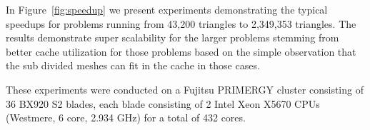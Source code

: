 \documentclass{manual}
\begin{document}
In Figure~\ref{fig:speedup} we present experiments demonstrating the typical speedups for problems running from 43,200 triangles to 2,349,353 triangles. The results demonstrate super scalability for the larger problems stemming from better cache utilization for those problems based on the simple observation that the sub divided meshes can fit in the cache in those cases. 

These experiments were conducted on a Fujitsu PRIMERGY cluster consisting of 36 BX920 S2 blades, each blade consisting of 2 Intel Xeon X5670 CPUs
(Westmere, 6 core, 2.934 GHz) for a total of 432 cores.



%
\end{document}
